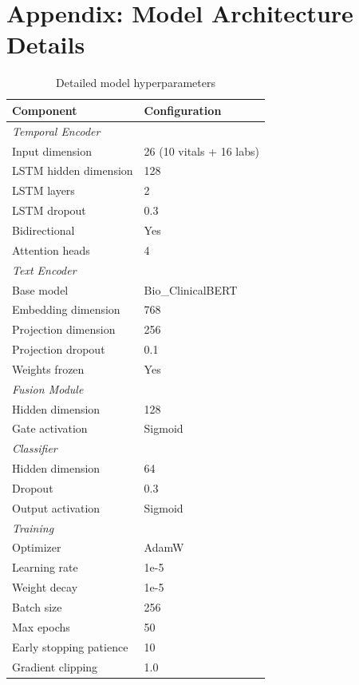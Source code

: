 \section{Appendix: Model Architecture Details}

\begin{table}[H]
\centering
\caption{Detailed model hyperparameters}
\label{tab:hyperparams}
\begin{tabular}{ll}
\toprule
\textbf{Component} & \textbf{Configuration} \\
\midrule
\multicolumn{2}{l}{\textit{Temporal Encoder}} \\
Input dimension & 26 (10 vitals + 16 labs) \\
LSTM hidden dimension & 128 \\
LSTM layers & 2 \\
LSTM dropout & 0.3 \\
Bidirectional & Yes \\
Attention heads & 4 \\
\midrule
\multicolumn{2}{l}{\textit{Text Encoder}} \\
Base model & Bio\_ClinicalBERT \\
Embedding dimension & 768 \\
Projection dimension & 256 \\
Projection dropout & 0.1 \\
Weights frozen & Yes \\
\midrule
\multicolumn{2}{l}{\textit{Fusion Module}} \\
Hidden dimension & 128 \\
Gate activation & Sigmoid \\
\midrule
\multicolumn{2}{l}{\textit{Classifier}} \\
Hidden dimension & 64 \\
Dropout & 0.3 \\
Output activation & Sigmoid \\
\midrule
\multicolumn{2}{l}{\textit{Training}} \\
Optimizer & AdamW \\
Learning rate & 1e-5 \\
Weight decay & 1e-5 \\
Batch size & 256 \\
Max epochs & 50 \\
Early stopping patience & 10 \\
Gradient clipping & 1.0 \\
\bottomrule
\end{tabular}
\end{table}

